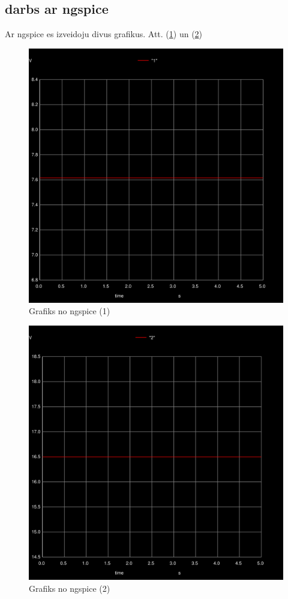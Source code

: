 \documentclass{report}
\begin{document}
\subsection{darbs ar ngspice}
Ar ngspice es izveidoju divus grafikus. Att. (\ref{ngspice grafiks 1}) un (\ref{ngspice grafiks 2})
\begin{figure}[!tb]
\includegraphics[width=\textwidth,height=\textheight,keepaspectratio]{011.png}
\caption{Grafiks no ngspice (1)}
\label{ngspice grafiks 1}
\end{figure}
\begin{figure}[!tb]
\includegraphics[width=\textwidth,height=\textheight,keepaspectratio]{012.png}
\caption{Grafiks no ngspice (2)}
\label{ngspice grafiks 2}
\end{figure}
\end{document}
